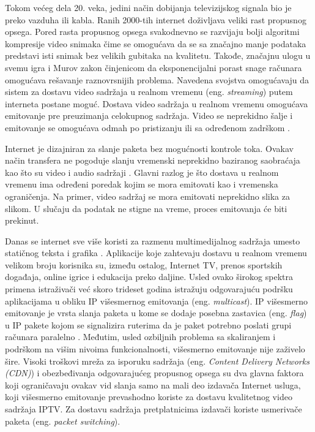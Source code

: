 \documentclass[12pt,oneside]{memoir}
\begin{document}
Tokom većeg dela 20. veka, jedini način dobijanja televizijskog signala bio je preko vazduha ili kabla. Ranih 2000-tih internet doživljava veliki rast propusnog opsega. Pored rasta propusnog opsega svakodnevno se razvijaju bolji algoritmi kompresije video snimaka čime se omogućava da se sa značajno manje podataka predstavi isti snimak bez velikih gubitaka na kvalitetu.
Takođe, značajnu ulogu u svemu igra i Murov zakon \cite{Moore} činjenicom da eksponencijalni porast snage računara omogućava rešavanje raznovrsnijih problema. Navedena svojstva omogućavaju da sistem za dostavu video sadržaja u realnom vremenu (eng. \textit{streaming}) putem interneta postane moguć. Dostava video sadržaja u realnom vremenu omogućava emitovanje pre preuzimanja celokupnog sadržaja. Video se neprekidno šalje i emitovanje se omogućava odmah po pristizanju ili sa određenom zadrškom \cite{Telecom}.

Internet je dizajniran za slanje paketa bez mogućnosti kontrole toka. Ovakav način transfera ne pogoduje slanju vremenski neprekidno baziranog saobraćaja kao što su video i audio sadržaji \cite{Tanenbaum}. Glavni razlog je što dostava u realnom vremenu ima određeni poredak kojim se mora emitovati kao i vremenska ograničenja. Na primer, video sadržaj se mora emitovati neprekidno slika za slikom. U slučaju da podatak ne stigne na vreme, proces emitovanja će biti prekinut.

Danas se internet sve više koristi za razmenu multimedijalnog sadržaja umesto statičnog teksta i grafika \cite{Beggs:1999}. Aplikacije koje zahtevaju dostavu u realnom vremenu velikom broju korisnika su, između ostalog, Internet TV, prenos sportskih događaja, online igrice i edukacija preko daljine. Usled ovako širokog spektra primena istraživači već skoro trideset godina istražuju odgovarajuću podršku aplikacijama u obliku IP višesmernog emitovanja (eng. \textit{multicast}). IP višesmerno emitovanje je vrsta slanja paketa u kome se dodaje posebna zastavica (eng. \textit{flag}) u IP pakete kojom se signalizira ruterima da je paket potrebno poslati grupi računara paralelno \cite{Deering:1990}. Međutim, usled ozbiljnih problema sa skaliranjem i podrškom na višim nivoima funkcionalnosti, višesmerno emitovanje nije zaživelo šire. Visoki troškovi mreža za isporuku sadržaja (eng. \textit{Content Delivery Networks (CDN)}) i obezbeđivanja odgovarajućeg propusnog opsega su dva glavna faktora koji ograničavaju ovakav vid slanja samo na mali deo izdavača Internet usluga, koji višesmerno emitovanje prevashodno koriste za dostavu kvalitetnog video sadržaja IPTV. Za dostavu sadržaja pretplatnicima izdavači koriste usmerivače paketa (eng. \textit{packet switching}). 
\end{document}
